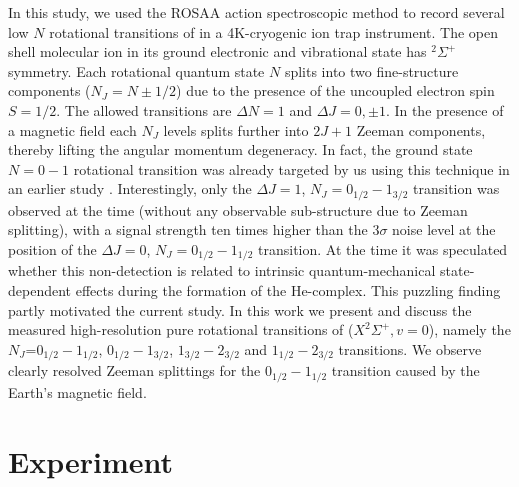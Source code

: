 In this study, we used the ROSAA action spectroscopic method \cite{Brunken2017} to record several low $N$ rotational transitions of \co in a 4K-cryogenic ion trap instrument. The open shell \co molecular ion in its ground electronic and vibrational state has $^2\Sigma ^+$ symmetry. Each rotational quantum state $N$ splits into two fine-structure components ($N_J=N \pm 1/2$) due to the presence of the uncoupled electron spin $S=1/2$. The allowed transitions are $\Delta N = 1$ and $\Delta J = 0, \pm 1$. In the presence of a magnetic field each $N_J$ levels splits further into $2J+1$ Zeeman components, thereby lifting the angular momentum degeneracy. In fact, the \co ground state $N=0-1$ rotational transition  was already targeted by us using this technique in an earlier study \cite{Brunken2017}. Interestingly, only the $\Delta J=1$, $N_J=0_{1/2}-1_{3/2}$ transition was observed at the time (without any observable sub-structure due to Zeeman splitting), with a signal strength ten times higher than the $3\sigma$ noise level at the position of the $\Delta J=0$,  $N_J=0_{1/2}-1_{1/2}$ transition. At the time it was speculated whether this non-detection is related to intrinsic quantum-mechanical state-dependent effects during the formation of the He-\co complex. This puzzling finding partly motivated the current study.
 In this work we present and discuss the measured high-resolution pure rotational transitions of \co ($X ^2\Sigma ^+, v=0$), namely the $N_J$=$0_{1/2}-1_{1/2}$, $0_{1/2}-1_{3/2}$, $1_{3/2}-2_{3/2}$ and $1_{1/2}-2_{3/2}$ transitions. We observe clearly resolved Zeeman splittings for the $0_{1/2}-1_{1/2}$ transition caused by the Earth’s magnetic field.

\section{Experiment}
\label{sec:method}

